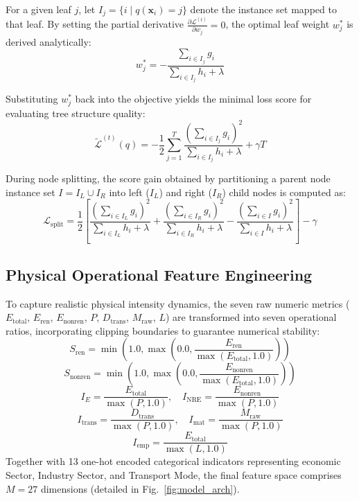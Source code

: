 \documentclass[conference]{IEEEtran}
\begin{document}
For a given leaf $j$, let $I_j = \{i \mid q(\mathbf{x}_i) = j\}$ denote the instance set mapped to that leaf. By setting the partial derivative $\frac{\partial \mathcal{L}^{(t)}}{\partial w_j} = 0$, the optimal leaf weight $w_j^*$ is derived analytically:
\begin{equation}
w_j^* = -\frac{\sum_{i \in I_j} g_i}{\sum_{i \in I_j} h_i + \lambda}
\label{eq:optimal_weight}
\end{equation}

Substituting $w_j^*$ back into the objective yields the minimal loss score for evaluating tree structure quality:
\begin{equation}
\tilde{\mathcal{L}}^{(t)}(q) = -\frac{1}{2} \sum_{j=1}^T \frac{\left(\sum_{i \in I_j} g_i\right)^2}{\sum_{i \in I_j} h_i + \lambda} + \gamma T
\end{equation}

During node splitting, the score gain obtained by partitioning a parent node instance set $I = I_L \cup I_R$ into left ($I_L$) and right ($I_R$) child nodes is computed as:
\begin{equation}
\mathcal{L}_{\text{split}} = \frac{1}{2}\left[ \frac{\left(\sum_{i \in I_L} g_i\right)^2}{\sum_{i \in I_L} h_i + \lambda} + \frac{\left(\sum_{i \in I_R} g_i\right)^2}{\sum_{i \in I_R} h_i + \lambda} - \frac{\left(\sum_{i \in I} g_i\right)^2}{\sum_{i \in I} h_i + \lambda} \right] - \gamma
\label{eq:gain}
\end{equation}

\subsection{Physical Operational Feature Engineering}
To capture realistic physical intensity dynamics, the seven raw numeric metrics ($E_{\text{total}}$, $E_{\text{ren}}$, $E_{\text{nonren}}$, $P$, $D_{\text{trans}}$, $M_{\text{raw}}$, $L$) are transformed into seven operational ratios, incorporating clipping boundaries to guarantee numerical stability:
\begin{equation}
S_{\text{ren}} = \min\left(1.0, \max\left(0.0, \frac{E_{\text{ren}}}{\max(E_{\text{total}}, 1.0)}\right)\right)
\end{equation}
\begin{equation}
S_{\text{nonren}} = \min\left(1.0, \max\left(0.0, \frac{E_{\text{nonren}}}{\max(E_{\text{total}}, 1.0)}\right)\right)
\end{equation}
\begin{equation}
I_E = \frac{E_{\text{total}}}{\max(P, 1.0)}, \quad I_{\text{NRE}} = \frac{E_{\text{nonren}}}{\max(P, 1.0)}
\end{equation}
\begin{equation}
I_{\text{trans}} = \frac{D_{\text{trans}}}{\max(P, 1.0)}, \quad I_{\text{mat}} = \frac{M_{\text{raw}}}{\max(P, 1.0)}
\end{equation}
\begin{equation}
I_{\text{emp}} = \frac{E_{\text{total}}}{\max(L, 1.0)}
\end{equation}
Together with 13 one-hot encoded categorical indicators representing economic Sector, Industry Sector, and Transport Mode, the final feature space comprises $M = 27$ dimensions (detailed in Fig.~\ref{fig:model_arch}).
\end{document}
